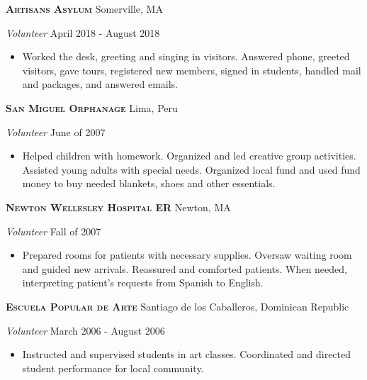 \documentclass[a4paper]{article}
\begin{document}
\textbf{\textsc{Artisans Asylum}} \hfill Somerville, MA\\
\begin{addmargin}[1em]{0em}
\vspace{2mm}
\textit{Volunteer} \hfill April 2018 - August 2018\\
\vspace{-1mm}
\begin{itemize} \itemsep 1pt
    \item Worked the desk, greeting and singing in visitors. Answered phone,
    greeted visitors, gave tours, registered new members, signed in students, 
    handled mail and packages, and answered emails.
\end{itemize}
\end{addmargin}

\textbf{\textsc{San Miguel Orphanage}} \hfill Lima, Peru\\
\begin{addmargin}[1em]{0em}
\vspace{2mm}
\textit{Volunteer} \hfill June of 2007\\
\vspace{-1mm}
\begin{itemize} \itemsep 1pt
    \item Helped children with homework.  Organized and led creative group activities.
        Assisted young adults with special needs. Organized local fund and used fund money
        to buy needed blankets, shoes and other essentials.
\end{itemize}
\end{addmargin}

\textbf{\textsc{Newton Wellesley Hospital ER}} \hfill Newton, MA\\
\begin{addmargin}[1em]{0em}
\vspace{2mm}
\textit{Volunteer} \hfill Fall of 2007\\
\vspace{-1mm}
\begin{itemize} \itemsep 1pt
    \item Prepared rooms for patients with necessary supplies. Oversaw waiting room and
        guided new arrivals. Reassured and comforted patients. When needed, interpreting 
        patient’s requests from Spanish to English.
\end{itemize}
\end{addmargin}

\textbf{\textsc{Escuela Popular de Arte}} \hfill Santiago de los Caballeros, Dominican Republic\\
\begin{addmargin}[1em]{0em}
\vspace{2mm}
\textit{Volunteer} \hfill March 2006 - August 2006\\
\vspace{-1mm}
\begin{itemize} \itemsep 1pt
    \item Instructed and supervised students in art classes. Coordinated and directed student 
        performance for local community. 
\end{itemize}
\end{addmargin}
\end{document}
